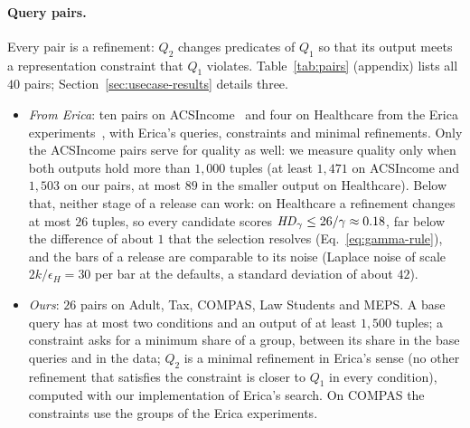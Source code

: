 \paragraph{Query pairs.}
Every pair is a refinement: $Q_2$ changes predicates of $Q_1$ so that its output meets a representation constraint that $Q_1$ violates. Table~\ref{tab:pairs} (appendix) lists all $40$ pairs; Section~\ref{sec:usecase-results} details three.
\begin{itemize}[leftmargin=*,itemsep=1pt,topsep=2pt]
  \item \emph{From Erica}: ten pairs on ACSIncome~\cite{LMSJ23} and four on Healthcare from the Erica experiments~\cite{ERICA}, with Erica's queries, constraints and minimal refinements. Only the ACSIncome pairs serve for quality as well: we measure quality only when both outputs hold more than $1{,}000$ tuples (at least $1{,}471$ on ACSIncome and $1{,}503$ on our pairs, at most $89$ in the smaller output on Healthcare). Below that, neither stage of a release can work: on Healthcare a refinement changes at most $26$ tuples, so every candidate scores $\mathit{HD}_\gamma\le26/\gamma\approx0.18$, far below the difference of about $1$ that the selection resolves (Eq.~\eqref{eq:gamma-rule}), and the bars of a release are comparable to its noise (Laplace noise of scale $2k/\epsilon_H=30$ per bar at the defaults, a standard deviation of about $42$).
  \item \emph{Ours}: $26$ pairs on Adult, Tax, COMPAS, Law Students and MEPS. A base query has at most two conditions and an output of at least $1{,}500$ tuples; a constraint asks for a minimum share of a group, between its share in the base queries and in the data; $Q_2$ is a minimal refinement in Erica's sense (no other refinement that satisfies the constraint is closer to $Q_1$ in every condition), computed with our implementation of Erica's search. On COMPAS the constraints use the groups of the Erica experiments.
\end{itemize}

